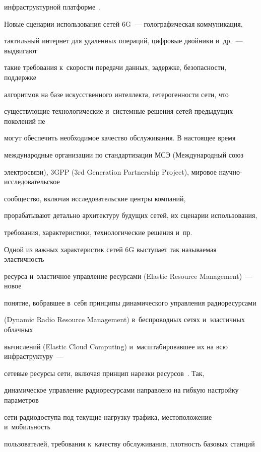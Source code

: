 инфраструктурной платформе~\cite{Kochetkova2021a,Vlaskina2022}.





Новые сценарии использования сетей 6G~--- голографическая коммуникация, 


тактильный интернет для удаленных операций, цифровые двойники и~др.~--- выдвигают 


такие требования к~ско\-рости передачи данных, задержке, безопасности, поддержке 


алгоритмов на базе искусственного интеллекта, гетерогенности сети, что 


существующие технологические и~системные решения сетей предыдущих поколений не 


могут обеспечить необходимое качество обслуживания. В настоящее время 


международные организации по стандартизации МСЭ (Международный союз 


электросвязи), 3GPP (3rd Generation Partnership Project), мировое на\-уч\-но-ис\-сле\-до\-ва\-тель\-ское 


сообщество, включая исследовательские центры компаний, 


прорабатывают детально архитектуру будущих сетей, их сценарии использования, 


требования, характеристики, технологические решения и~пр.





Одной из важных характеристик сетей 6G выступает так называемая эластичность 


ресурса и~эластичное управ\-ле\-ние ресурсами (Elastic Resource Management)~--- новое 


понятие, вобравшее в~себя принципы динамического управления радиоресурсами 


(Dynamic Radio Resource Management) в~беспроводных сетях и~эластичных облачных 


вычислений (Elastic Cloud Computing) и~масштабировавшее их на всю инфраструктуру~--- 


сетевые ресурсы сети, включая принцип нарезки ресурсов~\cite{ITU}. Так, 


динамическое управление радиоресурсами направлено на гибкую настройку параметров 


сети радиодоступа под текущие нагрузку трафика, местоположение и~мобильность 


пользователей, требования к~качеству обслуживания, плотность базовых станций 



